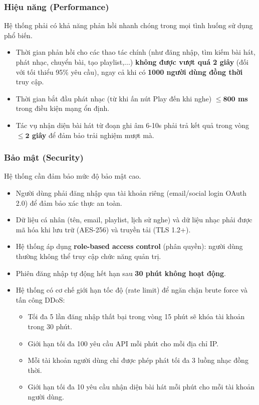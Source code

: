 \documentclass[a4paper]{article}
\begin{document}
\subsubsection{Hiệu năng (Performance)}
Hệ thống phải có khả năng phản hồi nhanh chóng trong mọi tình huống sử dụng phổ biến.
\begin{itemize}
	\item Thời gian phản hồi cho các thao tác chính (như đăng nhập, tìm kiếm bài hát, phát nhạc, chuyển bài, tạo playlist,...) \textbf{không được vượt quá 2 giây} (đối với tối thiểu 95\% yêu cầu), ngay cả khi có \textbf{1000 người dùng đồng thời} truy cập.
	\item Thời gian bắt đầu phát nhạc (từ khi ấn nút Play đến khi nghe) \textbf{$\leq \mathbf{800}$ ms} trong điều kiện mạng ổn định.
	\item Tác vụ nhận diện bài hát từ đoạn ghi âm 6-10s phải trả kết quả trong vòng \textbf{$\leq \mathbf{2}$ giây} để đảm bảo trải nghiệm mượt mà.
\end{itemize}

\subsubsection{Bảo mật (Security)}
Hệ thống cần đảm bảo mức độ bảo mật cao.
\begin{itemize}
	\item Người dùng phải đăng nhập qua tài khoản riêng (email/social login OAuth 2.0) để đảm bảo xác thực an toàn.
	\item Dữ liệu cá nhân (tên, email, playlist, lịch sử nghe) và dữ liệu nhạc phải được mã hóa khi lưu trữ (AES-256) và truyền tải (TLS 1.2+).
	\item Hệ thống áp dụng \textbf{role-based access control} (phân quyền): người dùng thường không thể truy cập chức năng quản trị.
	\item Phiên đăng nhập tự động hết hạn sau \textbf{30 phút không hoạt động}.
	\item Hệ thống có cơ chế giới hạn tốc độ (rate limit) để ngăn chặn brute force và tấn công DDoS:
	      \begin{itemize}
		      \item Tối đa 5 lần đăng nhập thất bại trong vòng 15 phút sẽ khóa tài khoản trong 30 phút.
		      \item Giới hạn tối đa 100 yêu cầu API mỗi phút cho mỗi địa chỉ IP.
		      \item Mỗi tài khoản người dùng chỉ được phép phát tối đa 3 luồng nhạc đồng thời.
		      \item Giới hạn tối đa 10 yêu cầu nhận diện bài hát mỗi phút cho mỗi tài khoản người dùng.
	      \end{itemize}
\end{itemize}
\end{document}
